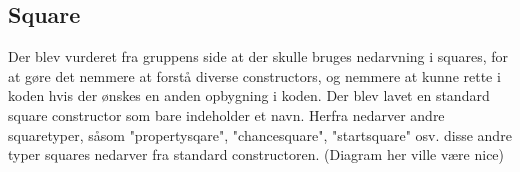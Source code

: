 \documentclass[../../main.tex]{subfiles}
\begin{document}
\subsection{Square}

Der blev vurderet fra gruppens side at der skulle bruges nedarvning i squares, for at gøre det nemmere at forstå diverse constructors, og nemmere at kunne rette i koden hvis der ønskes en anden opbygning i koden. 
Der blev lavet en standard square constructor som bare indeholder et navn. Herfra nedarver andre squaretyper, såsom "propertysqare", "chancesquare", "startsquare" osv. disse andre typer squares nedarver fra standard constructoren. (Diagram her ville være nice) 
\end{document}
